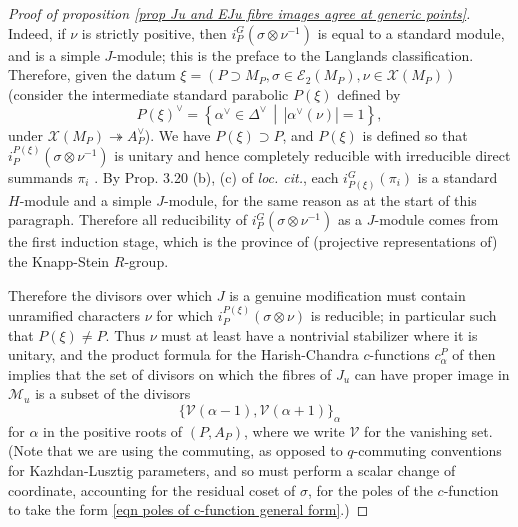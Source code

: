 \documentclass[10pt]{article}
\def\onto{\mathrel{\twoheadrightarrow}}
\newcommand{\sets}[2]{\left\{#1\,\middle|\,#2\right\}}
\newcommand{\X}{\mathcal{X}}
\newcommand{\Ee}{\mathcal{E}}
\theoremstyle{definition}
\theoremstyle{remark}
\newcommand{\mMu}{\mathcal{M}_u}
\begin{document}
\begin{proof}[Proof of proposition \ref{prop Ju and EJu fibre images agree at generic points}]
Indeed, if $\nu$ is strictly positive, then $i_P^G(\sigma\otimes\nu^{-1})$
is equal to a standard module, and is a simple $J$-module; this is the preface to the Langlands
classification. Therefore, given the datum $\xi=(P\supset M_P,\sigma\in\Ee_2(M_P),\nu\in\X(M_P))$
(consider the intermediate standard parabolic $P(\xi)$ defined by 
%
\[
P(\xi)^\vee=\sets{\alpha^\vee\in\Delta^\vee}{|\alpha^\vee(\nu)|=1},
\]
%
under $\X(M_P)\onto A_P^\vee$). We have $P(\xi)\supset P$, and $P(\xi)$ is defined so that $i_{P}^{P(\xi)}(\sigma\otimes\nu^{-1})$ 
is unitary and hence completely reducible 
with irreducible direct summands $\pi_i$ \cite[Prop. 3.20 (a)]{SolSurvey}. By Prop. 3.20 (b), (c) of \textit{loc. cit.}, 
each $i_{P(\xi)}^G(\pi_i)$ is a standard $H$-module and a simple $J$-module, for the same reason 
as at the start of this paragraph. Therefore all reducibility of 
$i_P^G(\sigma\otimes\nu^{-1})$ as a $J$-module comes from the first induction stage, which is the province 
of (projective representations of) the Knapp-Stein $R$-group. 


Therefore the divisors over which $J$ is a genuine modification must contain unramified characters
$\nu$ for which  $i_{P}^{P(\xi)}(\sigma\otimes\nu)$ is reducible; in particular
such that $P(\xi)\neq P$. Thus $\nu$ must at least have a nontrivial stabilizer where it is unitary,
and the product formula for the Harish-Chandra $c$-functions $c_\alpha^P$ of 
\cite[Section 4.1]{SolSurvey} then implies that the set of 
divisors on which the fibres of $J_u$ can have proper image in $\mMu$ is a subset of the 
divisors
%
\begin{equation}
\label{eqn poles of c-function general form}
\{\mathcal{V}(\alpha-1),\mathcal{V}(\alpha+1)\}_{\alpha}
\end{equation}
%
for $\alpha$ in the positive roots of $(P, A_P)$, where we write $\mathcal{V}$ for the vanishing set.
(Note that we are using the commuting, as opposed to $q$-commuting conventions for Kazhdan-Lusztig parameters, and so must perform a scalar change of coordinate, accounting for the residual coset of $\sigma$, for the poles of the $c$-function to take the form
\eqref{eqn poles of c-function general form}.)


\end{proof}
\end{document}

